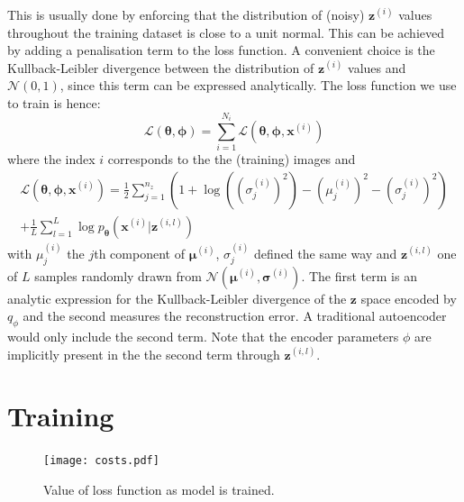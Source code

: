 \documentclass[]{article}
\begin{document}
This  is usually done by enforcing that the distribution of (noisy) $\bm{z}^{(i)}$ values throughout the training dataset is close to a unit normal. This can be achieved by adding a penalisation term to the loss function. A convenient choice is the Kullback-Leibler divergence between the distribution of $\bm{z}^{(i)}$ values and $\mathcal{N}(0, 1)$, since this term can be expressed analytically. The loss function we use to train is hence: 
\begin{equation}
  \mathcal{L}(\bm{\theta}, \bm{\phi}) = \sum_{i=1}^{N_i} \mathcal{L}(\bm{\theta}, \bm{\phi}, \bm{x}^{(i)})
\end{equation}
where the index $i$ corresponds to the the (training) images and
\begin{multline}
  \label{eq:loss}
  \mathcal{L}(\bm{\theta}, \bm{\phi}, \bm{x}^{(i)}) = \frac{1}{2} \sum_{j=1}^{n_z} \left( 1 + \log{((\sigma_j^{(i)})^2)} - (\mu_j^{(i)})^2 - (\sigma_j^{(i)})^2 \right) \\
  + \frac{1}{L} \sum_{l=1}^L \log{p_{\bm{\theta}}(\bm{x}^{(i)}|\bm{z}^{(i, l)})}
\end{multline}
with $\mu_j^{(i)}$ the $j$th component of $\bm{\mu}^{(i)}$, $\sigma_j^{(i)}$ defined the same way and $\bm{z}^{(i, l)}$ one of $L$ samples randomly drawn from $\mathcal{N}(\bm{\mu}^{(i)}, \bm{\sigma}^{(i)})$. The first term is an analytic expression for the Kullback-Leibler divergence of the $\bm{z}$ space encoded by $q_\phi$ and the second measures the reconstruction error. A traditional autoencoder would only include the second term. Note that the encoder parameters $\phi$ are implicitly present in the the second term through $\bm{z}^{(i, l)}$. 




\section{Training}
\label{sec:training}

\begin{figure}
  \centering
  \texttt{[image: costs.pdf]}
  \caption{Value of loss function as model is trained.}
  \label{fig:training_costs}
\end{figure}
\end{document}
